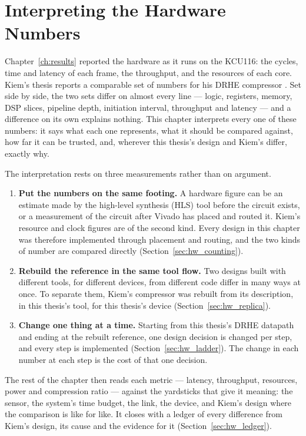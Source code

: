 \chapter{Interpreting the Hardware Numbers}
\label{ch:hwinterpret}

Chapter~\ref{ch:results} reported the hardware as it runs on the KCU116: the
cycles, time and latency of each frame, the throughput, and the resources of
each core. Kiem's thesis reports a comparable set of numbers for his DRHE
compressor \cite{kiem2025}. Set side by side, the two sets differ on almost
every line --- logic, registers, memory, DSP slices, pipeline depth, initiation
interval, throughput and latency --- and a difference on its own explains
nothing. This chapter interprets every one of these numbers: it says what each
one represents, what it should be compared against, how far it can be trusted,
and, wherever this thesis's design and Kiem's differ, exactly why.

The interpretation rests on three measurements rather than on argument.

\begin{enumerate}
\item \textbf{Put the numbers on the same footing.} A hardware figure can be an
estimate made by the high-level synthesis (HLS) tool before the circuit exists,
or a measurement of the circuit after Vivado has placed and routed it. Kiem's
resource and clock figures are of the second kind. Every design in this
chapter was therefore implemented through placement and routing, and the two
kinds of number are compared directly (Section~\ref{sec:hw_counting}).
\item \textbf{Rebuild the reference in the same tool flow.} Two designs built
with different tools, for different devices, from different code differ in many
ways at once. To separate them, Kiem's compressor was rebuilt from its
description, in this thesis's tool, for this thesis's device
(Section~\ref{sec:hw_replica}).
\item \textbf{Change one thing at a time.} Starting from this thesis's DRHE
datapath and ending at the rebuilt reference, one design decision is changed
per step, and every step is implemented (Section~\ref{sec:hw_ladder}). The
change in each number at each step is the cost of that one decision.
\end{enumerate}

\noindent
The rest of the chapter then reads each metric --- latency, throughput,
resources, power and compression ratio --- against the yardsticks that give it
meaning: the sensor, the system's time budget, the link, the device, and
Kiem's design where the comparison is like for like. It closes with a ledger of
every difference from Kiem's design, its cause and the evidence for it
(Section~\ref{sec:hw_ledger}).

